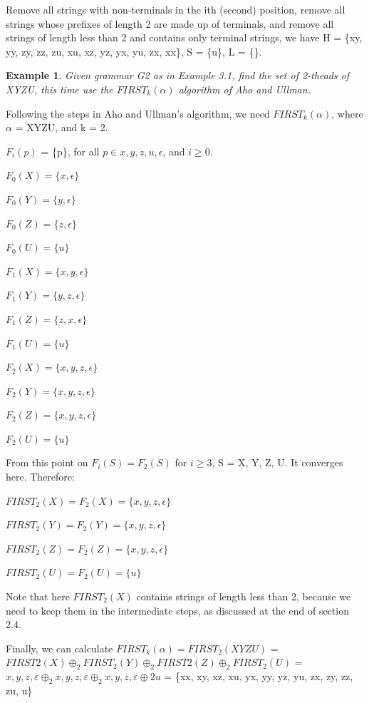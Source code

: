 \documentclass{sig-alternate-05-2015}
\newtheorem{SampleEnv}{Example}[section]
\begin{document}
Remove all strings with non-terminals in the ith (second)
position, remove all strings whose prefixes of length 2 are
made up of terminals, and remove all strings of length less
than 2 and contains only terminal strings, we have H = \{xy,
yy, zy, zz, zu, xu, xz, yz, yx, yu, zx, xx\}, S = \{u\}, L = \{\}.

\begin{SampleEnv}

Given grammar G2 as in Example 3.1, find
the set of 2-theads of XYZU, this time use the $FIRST_k(\alpha)$
algorithm of Aho and Ullman.
\end{SampleEnv}

Following the steps in Aho and Ullman's algorithm, we
need $FIRST_k(\alpha)$, where $\alpha$ = XYZU, and k = 2.

$F_i(p)$ = \{p\}, for all $p \in {x, y, z, u, \epsilon}$, and $i \geq 0$.

$F_0(X) = \{x, \epsilon\}$

$F_0(Y) = \{y, \epsilon\}$

$F_0(Z) = \{z, \epsilon\}$

$F_0(U) = \{u\}$

$F_1(X) = \{x, y, \epsilon\}$

$F_1(Y) = \{y, z, \epsilon\}$

$F_1(Z) = \{z, x, \epsilon\}$

$F_1(U) = \{u\}$

$F_2(X) = \{x, y, z, \epsilon\}$

$F_2(Y) = \{x, y, z, \epsilon\}$

$F_2(Z) = \{x, y, z, \epsilon\}$

$F_2(U) = \{u\}$

\hfill

From this point on $F_i(S) = F_2(S)$ for $i \geq 3$, S = X, Y, Z,
U. It converges here. Therefore:

$FIRST_2(X) = F_2(X) = \{x, y, z, \epsilon\}$

$FIRST_2(Y) = F_2(Y) = \{x, y, z, \epsilon\}$

$FIRST_2(Z) = F_2(Z) = \{x, y, z, \epsilon\}$

$FIRST_2(U) = F_2(U) = \{u\}$

\hfill

Note that here $FIRST_2(X)$ contains strings of length less
than 2, because we need to keep them in the intermediate
steps, as discussed at the end of section 2.4.

Finally, we can calculate $FIRST_k(\alpha) = FIRST_2(XYZU)$
= $FIRST2(X)\oplus_2FIRST_2(Y)\oplus_2 FIRST2(Z)\oplus_2 FIRST_2(U)$
= ${x, y, z, ε}\oplus_2{x, y, z, ε}\oplus_2{x, y, z, ε}\oplus2{u}$
= \{xx, xy, xz, xu, yx, yy, yz, yu, zx, zy, zz, zu, u\}
\end{document}
